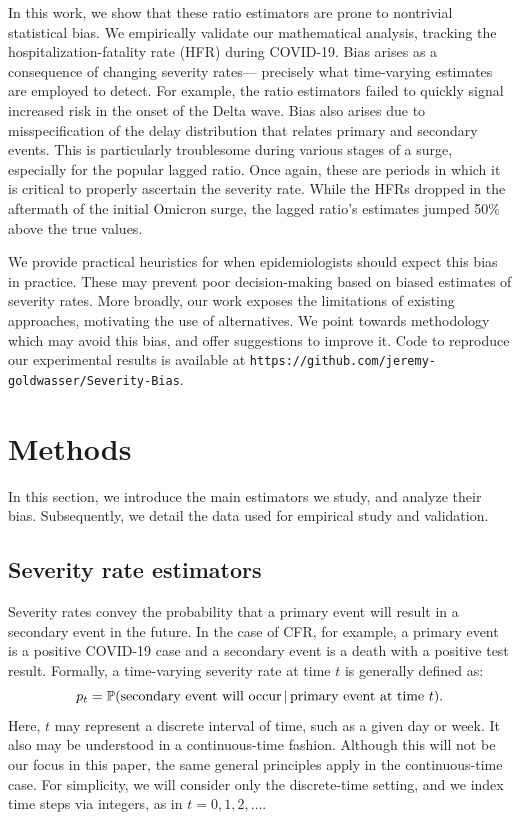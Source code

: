 \documentclass{article}
\newcommand{\given}{\, \vert \,}
\begin{document}
In this work, we show that these ratio estimators are prone to nontrivial
statistical bias. 
We empirically validate our mathematical analysis, 
tracking the hospitalization-fatality rate (HFR) during COVID-19.
Bias arises as a consequence of changing severity
rates---
precisely what time-varying estimates are employed to detect.
For example, the ratio estimators failed to quickly signal increased
risk in the onset of the Delta wave.
Bias also arises due to misspecification of the delay distribution that relates primary and secondary events. 
This is particularly troublesome during various stages of a surge, especially for the popular lagged ratio.
Once again, these are periods in which it is critical to properly ascertain the severity rate.
While the HFRs dropped in the aftermath of the initial Omicron surge, the lagged ratio's estimates jumped 50\% above the true values.

We provide practical heuristics for when epidemiologists should expect this bias in practice. 
These may prevent poor decision-making based on biased estimates of severity rates. 
More broadly, our work exposes the limitations of existing approaches, motivating the use of alternatives.
We point towards methodology which may avoid this bias, and offer suggestions to improve it.
Code to reproduce our experimental results is available at \texttt{https://github.com/jeremy-goldwasser/Severity-Bias}.

\section{Methods}
\label{sec:methods}

In this section, we introduce the main estimators we study, and analyze their 
bias. Subsequently, we detail the data used for empirical study and validation. 

\subsection{Severity rate estimators}
\label{sec:defs}

Severity rates convey the probability that a primary event will result in a
secondary event in the future. In the case of CFR, for example, a primary event
is a positive COVID-19 case and a secondary event is a death with a positive
test result. Formally, a time-varying severity rate at time $t$ is generally
defined as:  
\begin{equation}
\label{eq:severity}
p_t = \P(\text{secondary event will occur} \given \text{primary event at time 
  $t$}).   
\end{equation}
Here, $t$ may represent a discrete interval of time, such as a given day or 
week. It also may be understood in a continuous-time fashion. Although this will    
not be our focus in this paper, the same general principles apply in the
continuous-time case. For simplicity, we will consider only the discrete-time 
setting, and we index time steps via integers, as in $t=0,1,2,\dots$.    
\end{document}
